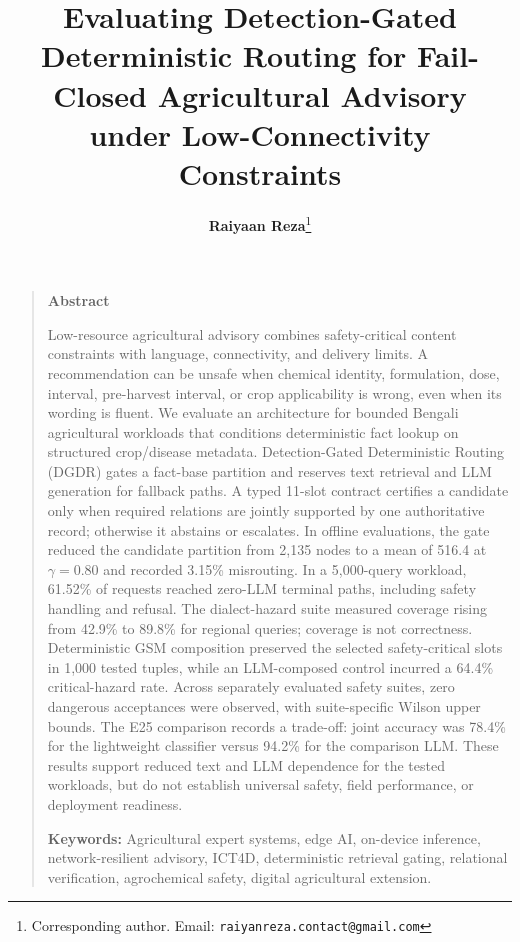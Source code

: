 \documentclass[11pt,a4paper]{article}
\title{\vspace{-1.5em}\LARGE\bfseries\color{agriDark} Evaluating Detection-Gated Deterministic Routing for Fail-Closed Agricultural Advisory under Low-Connectivity Constraints\vspace{0.3em}}
\author{\textbf{Raiyaan Reza}\thanks{Corresponding author. Email: \texttt{raiyanreza.contact@gmail.com}}}
\affil{\small Independent Agricultural AI Researcher \& Systems Engineer, Dhaka, Bangladesh}
\date{}
\begin{document}
\maketitle
\thispagestyle{plain}

\vspace{-1.0em}
\begin{quote}
\small
\noindent\textbf{\color{agriDark}\large Abstract}\vspace{0.4em}

\noindent
Low-resource agricultural advisory combines safety-critical content constraints with language, connectivity, and delivery limits. A recommendation can be unsafe when chemical identity, formulation, dose, interval, pre-harvest interval, or crop applicability is wrong, even when its wording is fluent. We evaluate an architecture for bounded Bengali agricultural workloads that conditions deterministic fact lookup on structured crop/disease metadata. Detection-Gated Deterministic Routing (DGDR) gates a fact-base partition and reserves text retrieval and LLM generation for fallback paths. A typed 11-slot contract certifies a candidate only when required relations are jointly supported by one authoritative record; otherwise it abstains or escalates. In offline evaluations, the gate reduced the candidate partition from 2{,}135 nodes to a mean of 516.4 at $\gamma=0.80$ and recorded 3.15\% misrouting. In a 5{,}000-query workload, 61.52\% of requests reached zero-LLM terminal paths, including safety handling and refusal. The dialect-hazard suite measured coverage rising from 42.9\% to 89.8\% for regional queries; coverage is not correctness. Deterministic GSM composition preserved the selected safety-critical slots in 1{,}000 tested tuples, while an LLM-composed control incurred a 64.4\% critical-hazard rate. Across separately evaluated safety suites, zero dangerous acceptances were observed, with suite-specific Wilson upper bounds. The E25 comparison records a trade-off: joint accuracy was 78.4\% for the lightweight classifier versus 94.2\% for the comparison LLM. These results support reduced text and LLM dependence for the tested workloads, but do not establish universal safety, field performance, or deployment readiness.

\vspace{0.8em}
\noindent\textbf{Keywords:} Agricultural expert systems, edge AI, on-device inference, network-resilient advisory, ICT4D, deterministic retrieval gating, relational verification, agrochemical safety, digital agricultural extension.
\end{quote}
\end{document}
